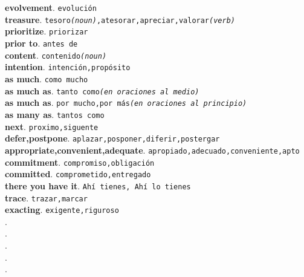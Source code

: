 \documentclass[twocolumn]{article}
\begin{document}
	\textsf{\textbf{evolvement}}. \texttt{evoluci\'on}\\
    \textsf{\textbf{treasure}}. \texttt{tesoro{\scriptsize \textsl{(noun)}},atesorar,apreciar,valorar{\scriptsize \textsl{(verb)}}}\\
	\textsf{\textbf{prioritize}}. \texttt{priorizar}\\
	\textsf{\textbf{prior to}}. \texttt{antes de}\\
	\textsf{\textbf{content}}. \texttt{contenido{\scriptsize \textsl{(noun)}}}\\
	\textsf{\textbf{intention}}. \texttt{intenci\'on,prop\'osito}\\
	\textsf{\textbf{as much}}. \texttt{como mucho}\\
	\textsf{\textbf{as much as}}. \texttt{tanto como{\scriptsize \textsl{(en oraciones al medio)}}}\\
	\textsf{\textbf{as much as}}. \texttt{por mucho,por m\'as{\scriptsize \textsl{(en oraciones al principio)}}}\\
	\textsf{\textbf{as many as}}. \texttt{tantos como}\\
	\textsf{\textbf{next}}. \texttt{proximo,siguente}\\
	\textsf{\textbf{defer,postpone}}. \texttt{aplazar,posponer,diferir,postergar}\\
	\textsf{\textbf{appropriate,convenient,adequate}}. \texttt{apropiado,adecuado,conveniente,apto}\\
	\textsf{\textbf{commitment}}. \texttt{compromiso,obligaci\'on}\\
	\textsf{\textbf{committed}}. \texttt{comprometido,entregado}\\
	\textsf{\textbf{there you have it}}. \texttt{Ah\'i tienes, Ah\'i lo tienes}\\
	\textsf{\textbf{trace}}. \texttt{trazar,marcar}\\
	\textsf{\textbf{exacting}}. \texttt{exigente,riguroso}\\
	\textsf{\textbf{}}. \texttt{}\\
	\textsf{\textbf{}}. \texttt{}\\
	\textsf{\textbf{}}. \texttt{}\\
	\textsf{\textbf{}}. \texttt{}\\
	\textsf{\textbf{}}. \texttt{}\\
\end{document}
